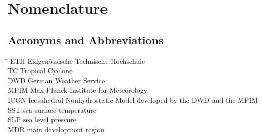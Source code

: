  
 

\chapter*{Nomenclature}\label{chap:symbole}
 
\section*{Acronyms and Abbreviations}
\begin{tabbing}
 \hspace*{1.6cm}  \= \kill
 ETH \> Eidgen\"{o}ssische Technische Hochschule \\[0.5ex]
 TC \> Tropical Cyclone \\[0.5ex]
 DWD \> German Weather Service\\[0.5ex]
 MPIM \> Max Planck Institute for Meteorology\\[0.5ex]
ICON \> Icosahedral Nonhydrostatic Model developed by the DWD and the
MPIM\\[0.5ex]
SST \> sea surface temperature\\[0.5ex]
SLP \> sea level pressure\\[0.5ex]
MDR \> main development region  \\[0.5ex]
\end{tabbing}


